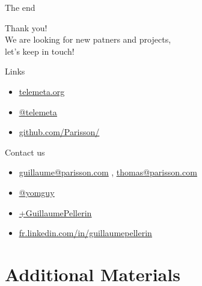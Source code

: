 \documentclass[final, hyperref, table]{beamer}
\newcommand{\chref}[2]{
    \href{#1}{\color{rouge}\underline{#2}}
}
\begin{document}
\begin{frame}{The end}
 \begin{center}
   \large{Thank you!}\\
   \large{We are looking for new patners and projects,\\ let's keep in touch!}   
    \begin{block}{Links}
     \begin{itemize}\small
        \item \chref{http://telemeta.org}{telemeta.org}
        \item \chref{https://twitter.com/telemeta/}{@telemeta}
        \item \chref{http://github.com/Parisson/}{github.com/Parisson/}
    \end{itemize}
    \end{block}
    \begin{block}{Contact us}
    \begin{itemize}\small
    \item \chref{mailto:guillaume@parisson.com}{guillaume@parisson.com}, \chref{mailto:thomas@parisson.com}{thomas@parisson.com}
    \item \chref{https://twitter.com/yomguy/}{@yomguy}
    \item \chref{https://plus.google.com/u/0/+GuillaumePellerin/posts}{+GuillaumePellerin}
    \item \chref{http://fr.linkedin.com/in/guillaumepellerin}{fr.linkedin.com/in/guillaumepellerin}
    \end{itemize}
     \end{block}
  \end{center}
\end{frame}

\appendix
\section{Additional Materials}
\end{document}
